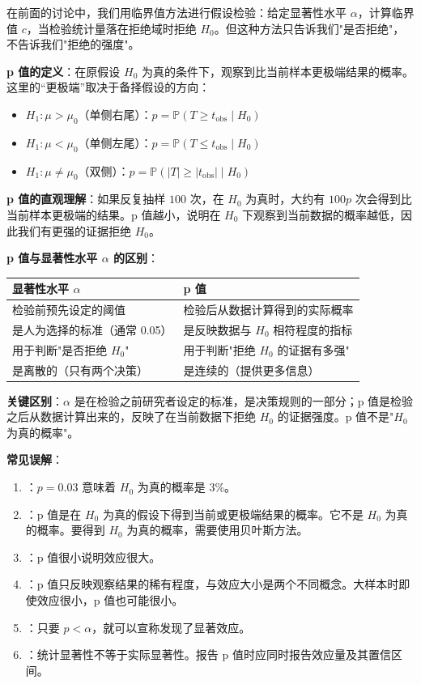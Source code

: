 在前面的讨论中，我们用临界值方法进行假设检验：给定显著性水平 $\alpha$，计算临界值 $c$，当检验统计量落在拒绝域时拒绝 $H_0$。但这种方法只告诉我们"是否拒绝"，不告诉我们"拒绝的强度"。

\textbf{p 值的定义}：在原假设 $H_0$ 为真的条件下，观察到比当前样本更极端结果的概率。这里的``更极端''取决于备择假设的方向：

\begin{itemize}
\item $H_1: \mu > \mu_0$（单侧右尾）：$p = \mathbb{P}(T \geq t_{\mathrm{obs}} \mid H_0)$
\item $H_1: \mu < \mu_0$（单侧左尾）：$p = \mathbb{P}(T \leq t_{\mathrm{obs}} \mid H_0)$
\item $H_1: \mu \neq \mu_0$（双侧）：$p = \mathbb{P}(|T| \geq |t_{\mathrm{obs}}| \mid H_0)$
\end{itemize}

\textbf{p 值的直观理解}：如果反复抽样 $100$ 次，在 $H_0$ 为真时，大约有 $100p$ 次会得到比当前样本更极端的结果。p 值越小，说明在 $H_0$ 下观察到当前数据的概率越低，因此我们有更强的证据拒绝 $H_0$。

\textbf{p 值与显著性水平 $\alpha$ 的区别}：

\begin{center}
\begin{tabular}{p{6cm}|p{6cm}}
\hline
\textbf{显著性水平 $\alpha$} & \textbf{p 值} \\ \hline
检验前预先设定的阈值 & 检验后从数据计算得到的实际概率 \\
是人为选择的标准（通常 0.05） & 是反映数据与 $H_0$ 相符程度的指标 \\
用于判断"是否拒绝 $H_0$" & 用于判断"拒绝 $H_0$ 的证据有多强" \\
是离散的（只有两个决策） & 是连续的（提供更多信息）\\ \hline
\end{tabular}
\end{center}

\textbf{关键区别}：$\alpha$ 是在检验之前研究者设定的标准，是决策规则的一部分；p 值是检验之后从数据计算出来的，反映了在当前数据下拒绝 $H_0$ 的证据强度。p 值不是"$H_0$ 为真的概率"。

\textbf{常见误解}：

\begin{enumerate}
\item[\textbf{误解 1}]：$p = 0.03$ 意味着 $H_0$ 为真的概率是 3\%。
\item[\textbf{正确理解}]：p 值是在 $H_0$ 为真的假设下得到当前或更极端结果的概率。它不是 $H_0$ 为真的概率。要得到 $H_0$ 为真的概率，需要使用贝叶斯方法。
\item[\textbf{误解 2}]：p 值很小说明效应很大。
\item[\textbf{正确理解}]：p 值只反映观察结果的稀有程度，与效应大小是两个不同概念。大样本时即使效应很小，p 值也可能很小。
\item[\textbf{误解 3}]：只要 $p < \alpha$，就可以宣称发现了显著效应。
\item[\textbf{正确理解}]：统计显著性不等于实际显著性。报告 p 值时应同时报告效应量及其置信区间。
\end{enumerate}

